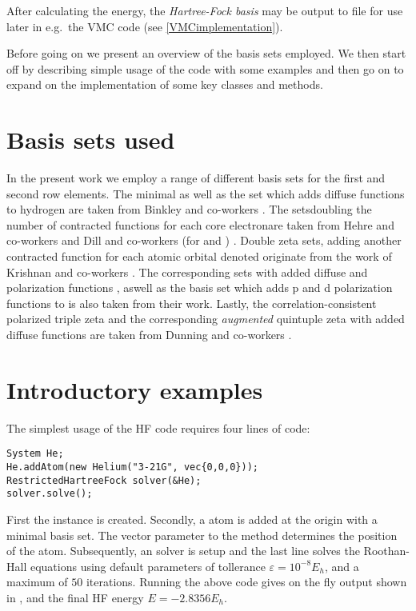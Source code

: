 \documentclass[../../master.tex]{subfiles}
\begin{document}
After calculating the energy, the \emph{Hartree-Fock basis} may be output to file for use later in e.g.\ the VMC code (see \ref{VMCimplementation}). 

Before going on we present an overview of the basis sets employed. We then start off by describing simple usage of the code with some examples and then go on to expand on the implementation of some key classes and methods.

\section{Basis sets used \label{basissetsused}}
In the present work we employ a range of different basis sets for the first and second row elements. The minimal  as well as the  set which adds diffuse functions to hydrogen are taken from Binkley and co-workers \cite{binkley1980}. The  sets\textemdash doubling the number of contracted functions for each core electron\textemdash are taken from Hehre and co-workers and Dill and co-workers (for  and ) \cite{hehre1972,dill1975}. Double zeta sets, adding another contracted function for each atomic orbital denoted  originate from the work of Krishnan and co-workers \cite{krishnan1980}. The corresponding sets with added diffuse and polarization functions , aswell as the  basis set which adds p and d polarization functions to  is also taken from their work. Lastly, the correlation-consistent polarized triple zeta  and the corresponding \emph{augmented}  quintuple zeta with added diffuse functions are taken from Dunning and co-workers \cite{dunning1989}.

\section{Introductory examples \label{hfexample}}
The simplest usage of the HF code requires four lines of \CC{}  code:
\begin{lstlisting}[language={[std]c++}]
System He;
He.addAtom(new Helium("3-21G", vec{0,0,0}));
RestrictedHartreeFock solver(&He);
solver.solve();
\end{lstlisting}
First the  instance is created. Secondly, a  atom is added at the origin with a minimal  basis set. The vector  parameter to the  method determines the position of the atom. Subsequently, an  solver is setup and the last line solves the Roothan-Hall equations using default parameters of tollerance $\varepsilon=10^{-8}E_h$, and a maximum of $50$ iterations. Running the above code gives on the fly output shown in , and the final HF energy $E=-2.8356E_h$.
\end{document}

